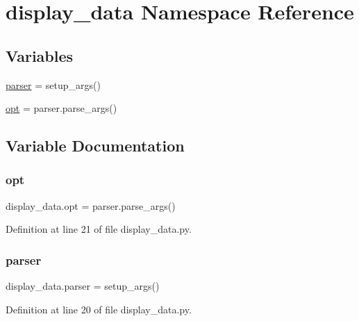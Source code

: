 \hypertarget{namespacedisplay__data}{}\section{display\+\_\+data Namespace Reference}
\label{namespacedisplay__data}
\subsection*{Variables}
\begin{DoxyCompactItemize}
\item 
\hyperlink{namespacedisplay__data_aa3243f42a25038810d228d5d226a038c}{parser} = setup\+\_\+args()
\item 
\hyperlink{namespacedisplay__data_a52acd52b27bb3118944fbb9cf76caaf4}{opt} = parser.\+parse\+\_\+args()
\end{DoxyCompactItemize}


\subsection{Variable Documentation}
\mbox{\label{namespacedisplay__data_a52acd52b27bb3118944fbb9cf76caaf4}} 
\subsubsection{\texorpdfstring{opt}{opt}}
{\footnotesize\ttfamily display\+\_\+data.\+opt = parser.\+parse\+\_\+args()}



Definition at line 21 of file display\+\_\+data.\+py.

\mbox{\label{namespacedisplay__data_aa3243f42a25038810d228d5d226a038c}} 
\subsubsection{\texorpdfstring{parser}{parser}}
{\footnotesize\ttfamily display\+\_\+data.\+parser = setup\+\_\+args()}



Definition at line 20 of file display\+\_\+data.\+py.

